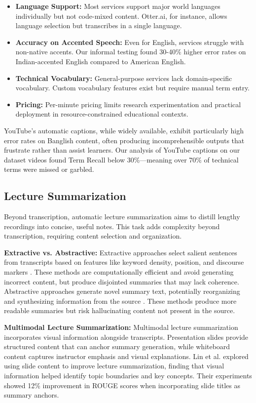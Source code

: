 \begin{itemize}
    \item \textbf{Language Support:} Most services support major world languages individually but not code-mixed content. Otter.ai, for instance, allows language selection but transcribes in a single language.
    \item \textbf{Accuracy on Accented Speech:} Even for English, services struggle with non-native accents. Our informal testing found 30-40\% higher error rates on Indian-accented English compared to American English.
    \item \textbf{Technical Vocabulary:} General-purpose services lack domain-specific vocabulary. Custom vocabulary features exist but require manual term entry.
    \item \textbf{Pricing:} Per-minute pricing limits research experimentation and practical deployment in resource-constrained educational contexts.
\end{itemize}

YouTube's automatic captions, while widely available, exhibit particularly high error rates on Banglish content, often producing incomprehensible outputs that frustrate rather than assist learners. Our analysis of YouTube captions on our dataset videos found Term Recall below 30\%---meaning over 70\% of technical terms were missed or garbled.

\subsection{Lecture Summarization}

Beyond transcription, automatic lecture summarization aims to distill lengthy recordings into concise, useful notes. This task adds complexity beyond transcription, requiring content selection and organization.

\textbf{Extractive vs. Abstractive:} Extractive approaches select salient sentences from transcripts based on features like keyword density, position, and discourse markers \cite{Liu2019}. These methods are computationally efficient and avoid generating incorrect content, but produce disjointed summaries that may lack coherence. Abstractive approaches generate novel summary text, potentially reorganizing and synthesizing information from the source \cite{Zhang2020Pegasus}. These methods produce more readable summaries but risk hallucinating content not present in the source.

\textbf{Multimodal Lecture Summarization:} Multimodal lecture summarization incorporates visual information alongside transcripts. Presentation slides provide structured content that can anchor summary generation, while whiteboard content captures instructor emphasis and visual explanations. Lin et al. \cite{Lin2020} explored using slide content to improve lecture summarization, finding that visual information helped identify topic boundaries and key concepts. Their experiments showed 12\% improvement in ROUGE scores when incorporating slide titles as summary anchors.

